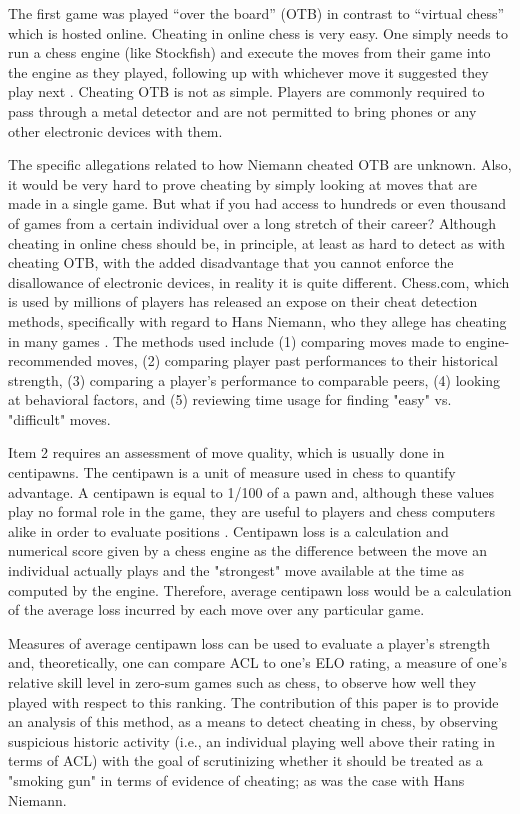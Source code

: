 \documentclass[12pt, letterpaper, titlepage]{article}
\begin{document}
The first game was played “over the board” (OTB) in contrast to “virtual chess” which is hosted online. Cheating in online chess is very easy. One simply needs to run a chess engine (like Stockfish) and execute the moves from their game into the engine as they played, following up with whichever move it suggested they play next \citep{kenregan2010}. Cheating OTB is not as simple. Players are commonly required to pass through a metal detector and are not permitted to bring phones or any other electronic devices with them.

The specific allegations related to how Niemann cheated OTB are unknown. Also, it would be very hard to prove cheating by simply looking at moves that are made in a single game. But what if you had access to hundreds or even thousand of games from a certain individual over a long stretch of their career? Although cheating in online chess should be, in principle, at least as hard to detect as with cheating OTB, with the added disadvantage that you cannot enforce the disallowance of electronic devices, in reality it is quite different. Chess.com, which is used by millions of players has released an expose on their cheat detection methods, specifically with regard to Hans Niemann, who they allege has cheating in many games \citep{erikallebest2022}. The methods used include (1) comparing moves made to engine-recommended moves, (2) comparing player past performances to their historical strength, (3) comparing a player's performance to comparable peers, (4) looking at behavioral factors, and (5) reviewing time usage for finding "easy" vs. "difficult" moves.  

Item 2 requires an assessment of move quality, which is usually done in centipawns. The centipawn is a unit of measure used in chess to quantify advantage. A centipawn is equal to 1/100 of a pawn and, although these values play no formal role in the game, they are useful to players and chess computers alike in order to evaluate positions . Centipawn loss is a calculation and numerical score given by a chess engine as the difference between the move an individual actually plays and the "strongest" move available at the time as computed by the engine. Therefore, average centipawn loss would be a calculation of the average loss incurred by each move over any particular game.

Measures of average centipawn loss can be used to evaluate a player's strength and, theoretically, one can compare ACL to one's ELO rating, a measure of one's relative skill level in zero-sum games such as chess, to observe how well they played with respect to this ranking. The contribution of this paper is to provide an analysis of this method, as a means to detect cheating in chess, by observing suspicious historic activity (i.e., an individual playing well above their rating in terms of ACL) with the goal of scrutinizing whether it should be treated as a "smoking gun" in terms of evidence of cheating; as was the case with Hans Niemann.
\end{document}
